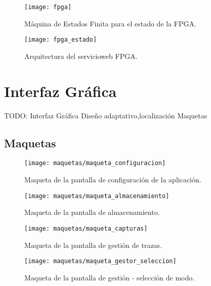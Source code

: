 \begin{figure}[!htp]
  \centering
  \texttt{[image: fpga]}
  \caption{Máquina de Estados Finita para el estado de la \gls{FPGA}.}
  \label{fig:arquitectura_servicio}
\end{figure}

\begin{figure}[!htp]
  \centering
  \texttt{[image: fpga\_estado]}
  \caption{Arquitectura del \gls{servicioweb} \gls{FPGA}.}
  \label{fig:fpga_estado}
\end{figure}

\section{Interfaz Gráfica\label{sec:dis:interfaz_grafica}}

TODO: Interfaz Gráfica
  {Diseño adaptativo,localización}
  {Maquetas}

\subsection{Maquetas\label{ssec:dis:maquetas}}

\begin{figure}[!htp]
  \centering
  \texttt{[image: maquetas/maqueta\_configuracion]}
  \caption{Maqueta de la pantalla de configuración de la aplicación.}
  \label{fig:maqueta:configuracion}
\end{figure}

\begin{figure}[!htp]
  \centering
  \texttt{[image: maquetas/maqueta\_almacenamiento]}
  \caption{Maqueta de la pantalla de almacenamiento.}
  \label{fig:maqueta:almacenamiento}
\end{figure}

\begin{figure}[!htp]
  \centering
  \texttt{[image: maquetas/maqueta\_capturas]}
  \caption{Maqueta de la pantalla de gestión de \glspl{traza}.}
  \label{fig:maqueta:capturas}
\end{figure}

\begin{figure}[!htp]
  \centering
  \texttt{[image: maquetas/maqueta\_gestor\_seleccion]}
  \caption{Maqueta de la pantalla de gestión - selección de modo.}
  \label{fig:maqueta:gestor_seleccion}
\end{figure}

